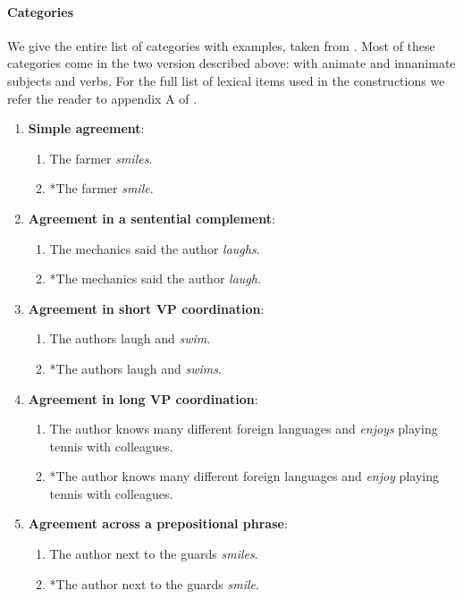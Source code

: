 \paragraph{Categories} We give the entire list of categories with examples, taken from \citet{linzen2018targeted}. Most of these categories come in the two version described above: with animate and innanimate subjects and verbs. For the full list of lexical items used in the constructions we refer the reader to appendix A of \citet{linzen2018targeted}.

\begin{enumerate}[noitemsep]
  \item \textbf{Simple agreement}:
    \begin{enumerate}
      \item The farmer \textit{smiles}.
      \item *The farmer \textit{smile}.
    \end{enumerate}
  \item \textbf{Agreement in a sentential complement}:
    \begin{enumerate}
      \item The mechanics said the author \textit{laughs}.
      \item *The mechanics said the author \textit{laugh}.
    \end{enumerate}
  \item \textbf{Agreement in short VP coordination}:
    \begin{enumerate}
      \item The authors laugh and \textit{swim}.
      \item *The authors laugh and \textit{swims}.
    \end{enumerate}
  \item \textbf{Agreement in long VP coordination}:
    \begin{enumerate}
      \item The author knows many different foreign languages and \textit{enjoys} playing tennis with colleagues.
      \item *The author knows many different foreign languages and \textit{enjoy} playing tennis with colleagues.
    \end{enumerate}
  \item \textbf{Agreement across a prepositional phrase}:
    \begin{enumerate}
      \item The author next to the guards \textit{smiles}.
      \item *The author next to the guards \textit{smile}.

\end{enumerate}
\end{enumerate}
